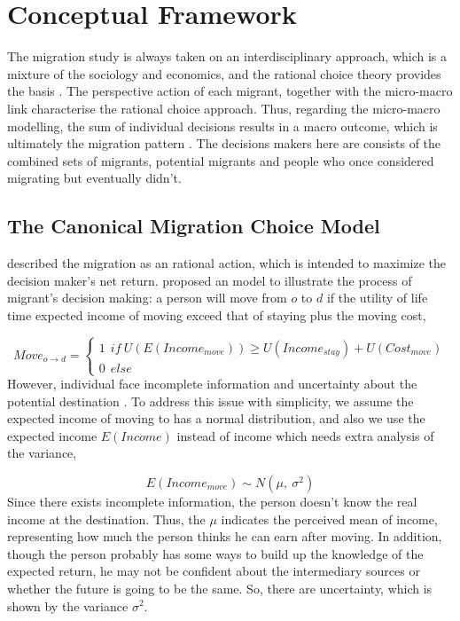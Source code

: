 \documentclass{article}
\begin{document}
\section{Conceptual Framework}
The migration study is always taken on an interdisciplinary approach, which is a mixture of the sociology and economics, and the rational choice theory provides the basis \parencite{Haug:2008mn}. The perspective action of each migrant, together with the micro-macro link characterise the rational choice approach. Thus, regarding the micro-macro modelling, the sum of individual decisions results in a macro outcome, which is ultimately the migration pattern \parencite{Schelling:1978mm}. The decisions makers here are consists of the combined sets of migrants, potential migrants and people who once considered migrating but eventually didn't.


\subsection{The Canonical Migration Choice Model} \label{model}
\textcite{Todaro:1970td} described the migration as an rational action, which is intended to maximize the decision maker's net return. \textcite{Sjaastad:1962cr} proposed an model to illustrate the process of migrant's decision making: a person will move from $o$ to $d$ if the utility of life time expected income of moving exceed that of staying plus the moving cost,

\begin{equation}\label{eq:model}
            {Move_{o\rightarrow d} = \begin{cases}
            1\  \  if\ U(E(Income_{move})) \geq U(Income_{stay}) + U(Cost_{move})\\
            0\   \  else
                         \end{cases}}
\end{equation}
However, individual face incomplete information and uncertainty about the potential destination \parencite{Wilson:2021wi}. To address this issue with simplicity, we assume the expected income of moving to has a normal distribution, and also we use the expected income $E(Income)$ instead of income which needs extra analysis of the variance,

\begin{equation}
    E(Income_{move}) \sim  N(\mu,\ \sigma^2)
\end{equation}
Since there exists incomplete information, the person doesn't know the real income at the destination. Thus, the $\mu$ indicates the perceived mean of income, representing how much the person thinks he can earn after moving. In addition, though the person probably has some ways to build up the knowledge of the expected return, he may not be confident about the intermediary sources or whether the future is going to be the same. So, there are uncertainty, which is shown by the variance $\sigma^2$.
\end{document}
